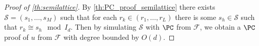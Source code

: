 \documentclass[11pt]{article}
\newtheorem{definition}[theorem]{Definition}
\newtheorem{proposition}[theorem]{Proposition}
\begin{document}
\begin{proof} [Proof of \cref{th:semilattice}]
    By \cref{th:PC_proof_semilattice} there exists $\mathcal{S} = (s_1, \dots, s_M)$ such that for each $r_k \in (r_1, \dots, r_L)$ there is some $s_h \in \mathcal{S}$ such that $r_k \cong s_h \mod{I_d}$. Then by simulating $\mathcal{S}$ with $\PC$ from $\mathcal{F}$, we obtain a $\PC$ proof of $u$ from $\mathcal{F}$ with degree bounded by $O(d)$.
    
\end{proof}










\end{document}
